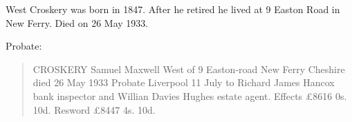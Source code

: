 
West Croskery was born in 1847.
After he retired he lived at 9 Easton Road in New Ferry.
Died on 26 May 1933.\cite{WestCroskeryProbate}

Probate:\cite{WestCroskeryProbate}
\begin{quotation}
CROSKERY Samuel Maxwell West of 9 Easton-road New Ferry Cheshire died 26 May 1933 Probate Liverpool 11 July to Richard James Hancox bank inspector and Willian Davies Hughes estate agent.  Effects \pounds 8616 0s. 10d. Resword \pounds 8447 4s. 10d.
\end{quotation}
